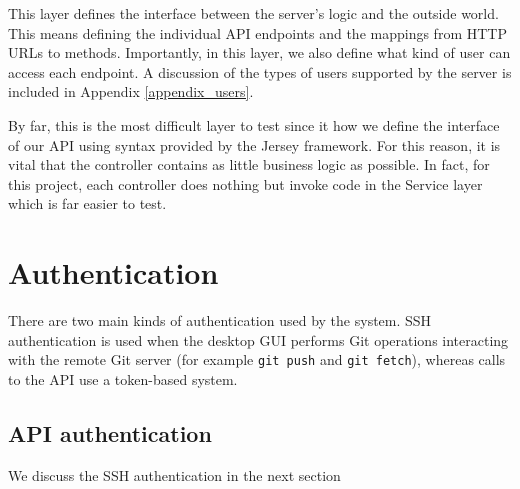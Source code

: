 This layer defines the interface between the server's logic and the outside world. This means defining the individual API endpoints and the mappings from HTTP URLs to methods. Importantly, in this layer, we also define what kind of user can access each endpoint. A discussion of the types of users supported by the server is included in Appendix \ref{appendix_users}.

By far, this is the most difficult layer to test since it how we define the interface of our API using syntax provided by the Jersey framework. For this reason, it is vital that the controller contains as little business logic as possible. In fact, for this project, each controller does nothing but invoke code in the Service layer which is far easier to test.

\section{Authentication}

There are two main kinds of authentication used by the system. SSH authentication is used when the desktop GUI performs Git operations interacting with the remote Git server (for example \texttt{git push} and \texttt{git fetch}), whereas calls to the API use a token-based system. 

\subsection{API authentication}

We discuss the SSH authentication in the next section
